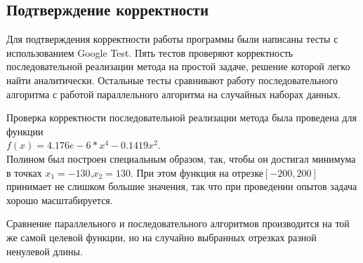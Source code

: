 \documentclass{article}
\begin{document}
\subsection*{Подтверждение корректности}
\par Для подтверждения корректности работы программы были написаны тесты с использованием Google Test. Пять тестов проверяют корректность последовательной реализации метода на простой задаче, решение которой легко найти аналитически. Остальные тесты сравнивают работу последовательного алгоритма с работой параллельного алгоритма на случайных наборах данных.
\par Проверка корректности последовательной реализации метода была проведена для функции
\\\(f(x) = 4.176e-6 * x^4 - 0.1419x^2 \). 
\\Полином был построен специальным образом, так, чтобы он достигал минимума в точках \(x_1 = -130\),\(x_2 = 130\). При этом функция на отрезке\([-200, 200]\) принимает не слишком большие значения, так что при проведении опытов задача хорошо масштабируется.
\\
\newpage
\par Сравнение параллельного и последовательного алгоритмов производится на той же самой целевой функции, но на случайно выбранных отрезках разной ненулевой длины.
\end{document}

